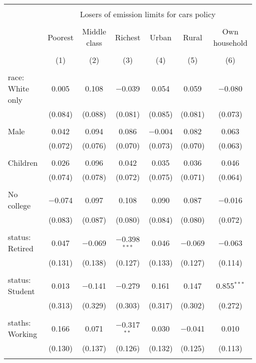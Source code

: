 
\begin{tabular}{@{\extracolsep{5pt}}lcccccc} 
\\[-1.8ex]\hline 
\hline \\[-1.8ex] 
 & \multicolumn{6}{c}{Losers of emission limits for cars policy} \\ 
\cline{2-7} 
\\[-1.8ex] & Poorest & Middle class & Richest & Urban & Rural & Own household \\ 
\\[-1.8ex] & (1) & (2) & (3) & (4) & (5) & (6)\\ 
\hline \\[-1.8ex] 
 race: White only & 0.005 & 0.108 & $-$0.039 & 0.054 & 0.059 & $-$0.080 \\ 
  & (0.084) & (0.088) & (0.081) & (0.085) & (0.081) & (0.073) \\ 
  & & & & & & \\ 
 Male & 0.042 & 0.094 & 0.086 & $-$0.004 & 0.082 & 0.063 \\ 
  & (0.072) & (0.076) & (0.070) & (0.073) & (0.070) & (0.063) \\ 
  & & & & & & \\ 
 Children & 0.026 & 0.096 & 0.042 & 0.035 & 0.036 & 0.046 \\ 
  & (0.074) & (0.078) & (0.072) & (0.075) & (0.071) & (0.064) \\ 
  & & & & & & \\ 
 No college & $-$0.074 & 0.097 & 0.108 & 0.090 & 0.087 & $-$0.016 \\ 
  & (0.083) & (0.087) & (0.080) & (0.084) & (0.080) & (0.072) \\ 
  & & & & & & \\ 
 status: Retired & 0.047 & $-$0.069 & $-$0.398$^{***}$ & 0.046 & $-$0.069 & $-$0.063 \\ 
  & (0.131) & (0.138) & (0.127) & (0.133) & (0.127) & (0.114) \\ 
  & & & & & & \\ 
 status: Student & 0.013 & $-$0.141 & $-$0.279 & 0.161 & 0.147 & 0.855$^{***}$ \\ 
  & (0.313) & (0.329) & (0.303) & (0.317) & (0.302) & (0.272) \\ 
  & & & & & & \\ 
 staths: Working & 0.166 & 0.071 & $-$0.317$^{**}$ & 0.030 & $-$0.041 & 0.010 \\ 
  & (0.130) & (0.137) & (0.126) & (0.132) & (0.125) & (0.113) \\ 
  & & & & & & \\ 

\end{tabular}
